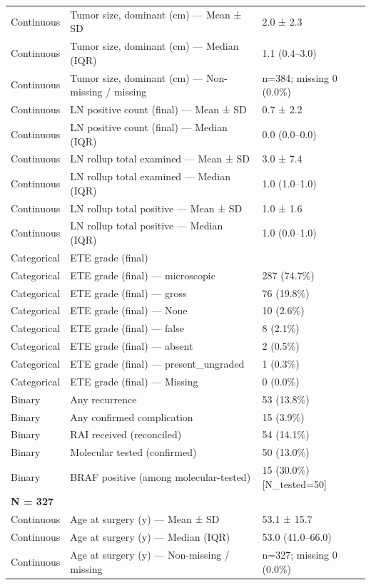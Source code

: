 \begin{table}[htbp]
\begin{tabular}{lll}
Continuous & Tumor size, dominant (cm) — Mean ± SD & 2.0 ± 2.3 \\
Continuous & Tumor size, dominant (cm) — Median (IQR) & 1.1 (0.4–3.0) \\
Continuous & Tumor size, dominant (cm) — Non-missing / missing & n=384; missing 0 (0.0\%) \\
Continuous & LN positive count (final) — Mean ± SD & 0.7 ± 2.2 \\
Continuous & LN positive count (final) — Median (IQR) & 0.0 (0.0–0.0) \\
Continuous & LN rollup total examined — Mean ± SD & 3.0 ± 7.4 \\
Continuous & LN rollup total examined — Median (IQR) & 1.0 (1.0–1.0) \\
Continuous & LN rollup total positive — Mean ± SD & 1.0 ± 1.6 \\
Continuous & LN rollup total positive — Median (IQR) & 1.0 (0.0–1.0) \\
Categorical & ETE grade (final) &  \\
Categorical & ETE grade (final) — microscopic & 287 (74.7\%) \\
Categorical & ETE grade (final) — gross & 76 (19.8\%) \\
Categorical & ETE grade (final) — None & 10 (2.6\%) \\
Categorical & ETE grade (final) — false & 8 (2.1\%) \\
Categorical & ETE grade (final) — absent & 2 (0.5\%) \\
Categorical & ETE grade (final) — present\_ungraded & 1 (0.3\%) \\
Categorical & ETE grade (final) — Missing & 0 (0.0\%) \\
Binary & Any recurrence & 53 (13.8\%) \\
Binary & Any confirmed complication & 15 (3.9\%) \\
Binary & RAI received (reconciled) & 54 (14.1\%) \\
Binary & Molecular tested (confirmed) & 50 (13.0\%) \\
Binary & BRAF positive (among molecular-tested) & 15 (30.0\%) [N\_tested=50] \\
\multicolumn{3}{l}{\textbf{N = 327}} \\
Continuous & Age at surgery (y) — Mean ± SD & 53.1 ± 15.7 \\
Continuous & Age at surgery (y) — Median (IQR) & 53.0 (41.0–66.0) \\
Continuous & Age at surgery (y) — Non-missing / missing & n=327; missing 0 (0.0\%) \\

\end{tabular}
\end{table}
